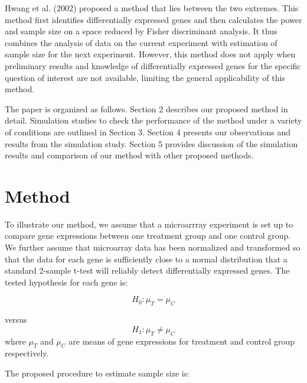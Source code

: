 \documentclass{bioinfo}
\begin{document}
Hwang et al.  (2002) proposed a method that lies between the two
extremes.  This method first identifies differentially expressed
genes and then calculates the power and sample size on a space
reduced by Fisher discriminant analysis. It thus combines the
analysis of data on the current experiment with estimation of
sample size for the next experiment. However, this method does not
apply when preliminary results and knowledge of differentially
expressed genes for the specific question of interest are not
available, limiting the general applicability of this method.

The paper is organized as follows. Section 2 describes our proposed
method in detail. Simulation studies to check the performance of the
method under a variety of conditions are outlined in Section 3.
Section 4 presents our observations and results from the simulation
study.  Section 5 provides discussion of the simulation results and
comparison of our method with other proposed methods.

\section{Method}
To illustrate our method, we assume that a microarrray experiment
is set up to compare gene expressions between one treatment group
and one control group. We further assume that microarray data has
been normalized and transformed so that the data for each gene is
sufficiently close to a normal distribution that a standard
2-sample t-test will reliably detect differentially expressed
genes. The tested hypothesis for each gene is:

\begin{equation}
  H_0: \mu_{T} = \mu_{C}  \nonumber
\end{equation}

versus
\begin{equation}
  H_1: \mu_{T} \neq \mu_{C} \nonumber
\end{equation}
where $\mu_{T}$ and $\mu_{C}$ are means of gene expressions for treatment and control group respectively.

The proposed procedure to estimate sample size is:
\end{document}

